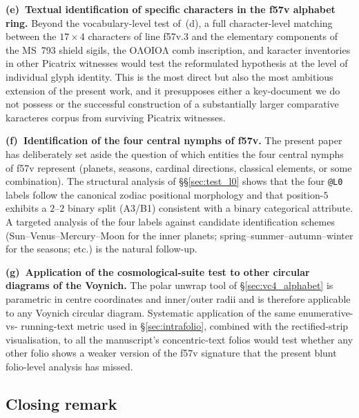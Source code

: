 \noindent\textbf{(e)~Textual identification of specific characters in
the f57v alphabet ring.} Beyond the vocabulary-level test of~(d), a
full character-level matching between the $17\!\times\!4$ characters
of line f57v.3 and the elementary components of the MS~793 shield
sigils, the $\mathrm{O\Lambda OIO\Lambda}$ comb inscription, and
karacter inventories in other Picatrix witnesses would test the
reformulated hypothesis at the level of individual glyph identity.
This is the most direct but also the most ambitious extension of the
present work, and it presupposes either a key-document we do not
possess or the successful construction of a substantially larger
comparative karacteres corpus from surviving Picatrix witnesses.

\noindent\textbf{(f)~Identification of the four central nymphs of
f57v.} The present paper has deliberately set aside the question of
which entities the four central nymphs of f57v represent (planets,
seasons, cardinal directions, classical elements, or some
combination). The structural analysis of \S\S\ref{sec:test_l0}
shows that the four \texttt{@L0} labels follow the canonical zodiac
positional morphology and that position-$5$ exhibits a
$2$--$2$ binary split (A3/B1) consistent with a binary categorical
attribute. A targeted analysis of the four labels against
candidate identification schemes (Sun--Venus--Mercury--Moon for the
inner planets; spring--summer--autumn--winter for the seasons;
etc.) is the natural follow-up.

\noindent\textbf{(g)~Application of the cosmological-suite test to
other circular diagrams of the Voynich.} The polar unwrap tool
 of
\S\ref{sec:vc4_alphabet} is parametric in centre coordinates and
inner/outer radii and is therefore applicable to any Voynich
circular diagram. Systematic application of the same enumerative-vs-
running-text metric used in \S\ref{sec:intrafolio}, combined with
the rectified-strip visualisation, to all the manuscript's
concentric-text folios would test whether any other folio shows a
weaker version of the f57v signature that the present blunt
folio-level analysis has missed.

\subsection{Closing remark}

